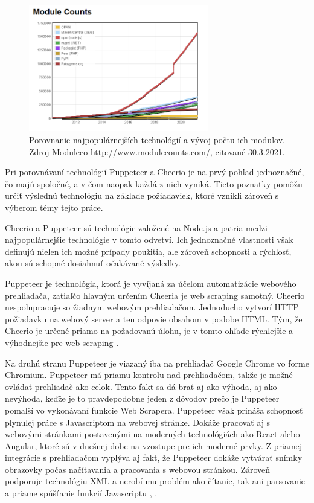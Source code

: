 \begin{figure}[hbt]
	\centering
	\includegraphics[width=0.7\textwidth]{obrazky-figures/modules.png}
	\caption{Porovnanie najpopulárnejších technológií a vývoj počtu ich modulov. Zdroj Moduleco \url{http://www.modulecounts.com/}, citované 30.3.2021.}
	\label{Moduleco_img}
\end{figure}

\bigskip

Pri porovnávaní technológií Puppeteer a Cheerio je na prvý pohľad jednoznačné, čo majú spoločné, a v čom naopak každá z nich vyniká. Tieto poznatky pomôžu určiť výslednú technológiu na základe požiadaviek, ktoré vznikli zároveň s výberom témy tejto práce.

Cheerio a Puppeteer sú technológie založené na Node.js a patria medzi najpopulárnejšie technológie v tomto odvetví. Ich jednoznačné vlastnosti však definujú nielen ich možné prípady použitia, ale zároveň schopnosti a rýchlosť, akou sú schopné dosiahnuť očakávané výsledky. 

\newpage

Puppeteer je technológia, ktorá je vyvíjaná za účelom automatizácie webového prehliadača, zatiaľčo hlavným určením Cheeria je web scraping samotný. Cheerio nespolupracuje so žiadnym webovým prehliadačom. Jednoducho vytvorí HTTP požiadavku na webový server a ten odpovie obsahom v podobe HTML. Tým, že Cheerio je určené priamo na požadovanú úlohu, je v tomto ohľade rýchlejšie a výhodnejšie pre web scraping \cite{cheerio}.

Na druhú stranu Puppeteer je viazaný iba na prehliadač Google Chrome vo forme Chromium. Puppeteer má priamu kontrolu nad prehliadačom, takže je možné ovládať prehliadač ako celok. Tento fakt sa dá brať aj ako výhoda, aj ako nevýhoda, keďže je to pravdepodobne jeden z dôvodov prečo je Puppeteer pomalší vo vykonávaní funkcie Web Scrapera. Puppeteer však prináša schopnosť plynulej práce s Javascriptom na webovej stránke. Dokáže pracovať aj s webovými stránkami postavenými na moderných technológiách ako React alebo Angular, ktoré sú v dnešnej dobe na vzostupe pre ich moderné prvky. Z priamej integrácie s prehliadačom vyplýva aj fakt, že Puppeteer dokáže vytvárať snímky obrazovky počas načítavania a pracovania s webovou stránkou. Zároveň podporuje technológiu XML a nerobí mu problém ako čítanie, tak ani parsovanie a priame spúšťanie funkcií Javascriptu \cite{puppeteer}, \cite{cheerio}. 

